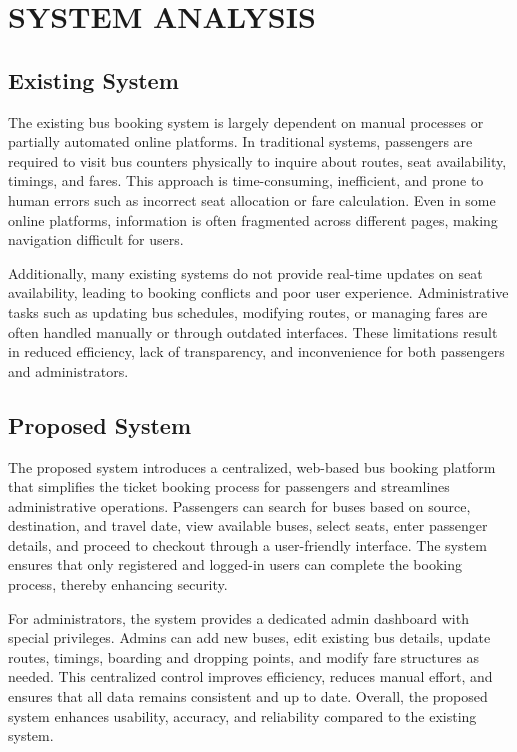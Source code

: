 \chapter{SYSTEM ANALYSIS}

\section{Existing System}

The existing bus booking system is largely dependent on manual processes or partially automated online platforms. In traditional systems, passengers are required to visit bus counters physically to inquire about routes, seat availability, timings, and fares. This approach is time-consuming, inefficient, and prone to human errors such as incorrect seat allocation or fare calculation. Even in some online platforms, information is often fragmented across different pages, making navigation difficult for users.

Additionally, many existing systems do not provide real-time updates on seat availability, leading to booking conflicts and poor user experience. Administrative tasks such as updating bus schedules, modifying routes, or managing fares are often handled manually or through outdated interfaces. These limitations result in reduced efficiency, lack of transparency, and inconvenience for both passengers and administrators.

\section{Proposed System}

The proposed system introduces a centralized, web-based bus booking platform that simplifies the ticket booking process for passengers and streamlines administrative operations. Passengers can search for buses based on source, destination, and travel date, view available buses, select seats, enter passenger details, and proceed to checkout through a user-friendly interface. The system ensures that only registered and logged-in users can complete the booking process, thereby enhancing security.

For administrators, the system provides a dedicated admin dashboard with special privileges. Admins can add new buses, edit existing bus details, update routes, timings, boarding and dropping points, and modify fare structures as needed. This centralized control improves efficiency, reduces manual effort, and ensures that all data remains consistent and up to date. Overall, the proposed system enhances usability, accuracy, and reliability compared to the existing system.

